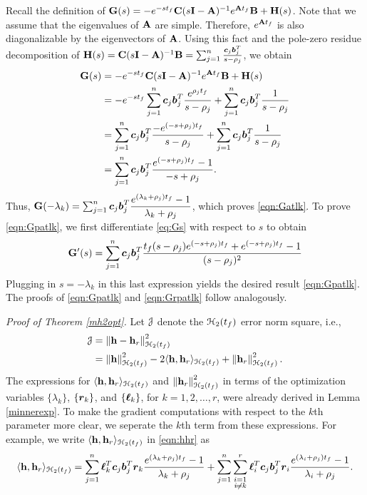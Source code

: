 \documentclass[twocolumn]{autart}
\begin{document}
\begin{pf}
Recall the definition of $\mathbf{G}(s) = -e^{-st_f}\mathbf{C}(s\mathbf{I}-\mathbf{A})^{-1}e^{\mathbf{A} t_f}\mathbf{B}+\mathbf{H}(s)$. Note that we assume that the eigenvalues of $\mathbf{A}$ are simple. Therefore, $e^{\mathbf{A} t_f}$ is also diagonalizable by the eigenvectors of $\mathbf{A}$. Using this fact and the pole-zero residue decomposition of   $\mathbf{H}(s) = \mathbf{C}(s\mathbf{I}-\mathbf{A})^{-1} \mathbf{B} = \sum_{j=1}^n \frac{\boldsymbol{c}_j \boldsymbol{b}_j^T}{s-\rho_j}$, we obtain 
\begin{align}
\mathbf{G}(s) &= -e^{-st_f}\mathbf{C}(s\mathbf{I}-\mathbf{A})^{-1}e^{\mathbf{A} t_f}\mathbf{B}+\mathbf{H}(s)  \nonumber \\ 
&=-e^{-s{t_f}}\sum_{j=1}^n\boldsymbol{c}_j\boldsymbol{b}_j^T\dfrac{e^{\rho_jt_f}}{s-\rho_j}+\sum_{j=1}^n\boldsymbol{c}_j\boldsymbol{b}_j^T\dfrac{1}{s-\rho_j}\\
&=\sum_{j=1}^n\boldsymbol{c}_j\boldsymbol{b}_j^T\dfrac{-e^{(-s + \rho_j){t_f}}}{s-\rho_j}+\sum_{j=1}^n\boldsymbol{c}_j\boldsymbol{b}_j^T\dfrac{1}{s-\rho_j} \nonumber\\
&=\sum_{j=1}^n\boldsymbol{c}_j\boldsymbol{b}_j^T\dfrac{e^{(-s+\rho_j)t_f}-1}{-s+\rho_j}. \label{eq:Gs}
\end{align}
Thus,
$\mathbf{G}(-\lambda_k)=\sum_{j=1}^n\boldsymbol{c}_j\boldsymbol{b}_j^T\dfrac{e^{(\lambda_k+\rho_j){t_f}}-1}{\lambda_k+\rho_j}$,
which proves \eqref{eqn:Gatlk}. To prove \eqref{eqn:Gpatlk}, we first differentiate \eqref{eq:Gs} with respect to $s$ to obtain
 \begin{align*}
 \mathbf{G}'(s) =\sum_{j=1}^n\boldsymbol{c}_j\boldsymbol{b}_j^T\dfrac {{t_f} (s-\rho_j)e^{(-s+\rho_j){t_f}}+e^{(-s+\rho_j){t_f}}-1}{(s-\rho_j)^2}
 \end{align*}
 Plugging in $s= -\lambda_k$ in this last expression yields the desired result \eqref{eqn:Gpatlk}. The proofs of
 \eqref{eqn:Gpatlk} and \eqref{eqn:Grpatlk} follow analogously. 
\end{pf}%
\emph{{Proof of Theorem \ref{mh2opt}.}}
 Let $\EuScript{J}$ denote the $\EuScript{H}_2({t_f})$ error norm square, i.e., 
\begin{align*}
 \EuScript{J}&=\left\lVert\mathbf{h} -\mathbf{h}_r\right\rVert^2_{\EuScript{H}_2({t_f})} \\
&=\left\lVert\mathbf{h}\right\rVert_{\EuScript{H}_2({t_f})}^2-2 \langle\mathbf{h}, \mathbf{h}_r\rangle_{\EuScript{H}_2({t_f})}+\left\lVert\mathbf{h}_r\right\rVert_{\EuScript{H}_2({t_f})}^2.
\end{align*}
The expressions for $ \langle\mathbf{h}, \mathbf{h}_r\rangle_{\EuScript{H}_2({t_f})}$ and $\left\lVert\mathbf{h}_r\right\rVert_{\EuScript{H}_2({t_f})}^2$ in terms of the optimization variables $\{\lambda_k\}$, $\{\boldsymbol{r}_k\}$, and $\{\boldsymbol{\ell}_k\}$, for $k=1,2,\ldots,r$, were already derived in Lemma \eqref{minnerexp}. To make the gradient computations with respect to the $k$th parameter more clear, we seperate the $k$th term from these expressions. For example, we write $\langle\mathbf{h}, \mathbf{h}_r\rangle_{\EuScript{H}_2({t_f})}$ in \eqref{eqn:hhr} as
\begin{dmath*}
\langle\h, \h_r\rangle_{\ch_2({\tf})}=\sum_{j=1}^n\lc_{k}^T\cc_j\bb_j^T\rc_{k}\dfrac{e^{(\lambda_k+\rho_j){\tf}}-1}{\lambda_k+\rho_j}
+\sum_{j=1}^n\sum_{\substack{i=1\\i\neq k}}^r\lc_{i}^T\cc_j\bb_j^T\rc_{i}\dfrac{e^{(\lambda_i+\rho_j){\tf}}-1}{\lambda_i+\rho_j}.
\end{dmath*}
\end{document}
